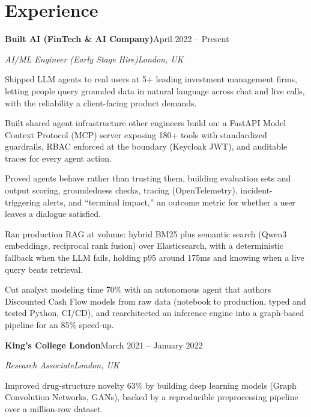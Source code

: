 \documentclass[10pt,a4paper]{article}
\newcommand{\entry}[4]{%
  {\color{company}\bfseries #1}\hfill {\color{muted}#2}\par
  \vspace{1pt}
  {\itshape #3}\hfill {\color{muted}\itshape #4}\par
  \vspace{3pt}%
}
\begin{document}
\section{Experience}
\entry{Built AI (FinTech \& AI Company)}{April 2022 -- Present}{AI/ML Engineer (Early Stage Hire)}{London, UK}
\begin{tight}
  \item Shipped LLM agents to real users at 5+ leading investment management firms, letting people query grounded data in natural language across chat and live calls, with the reliability a client-facing product demands.
  \item Built shared agent infrastructure other engineers build on: a FastAPI Model Context Protocol (MCP) server exposing 180+ tools with standardized guardrails, RBAC enforced at the boundary (Keycloak JWT), and auditable traces for every agent action.
  \item Proved agents behave rather than trusting them, building evaluation sets and output scoring, groundedness checks, tracing (OpenTelemetry), incident-triggering alerts, and ``terminal impact,'' an outcome metric for whether a user leaves a dialogue satisfied.
  \item Ran production RAG at volume: hybrid BM25 plus semantic search (Qwen3 embeddings, reciprocal rank fusion) over Elasticsearch, with a deterministic fallback when the LLM fails, holding p95 around 175ms and knowing when a live query beats retrieval.
  \item Cut analyst modeling time 70\% with an autonomous agent that authors Discounted Cash Flow models from raw data (notebook to production, typed and tested Python, CI/CD), and rearchitected an inference engine into a graph-based pipeline for an 85\% speed-up.
\end{tight}

\entry{King's College London}{March 2021 -- January 2022}{Research Associate}{London, UK}
\begin{tight}
  \item Improved drug-structure novelty 63\% by building deep learning models (Graph Convolution Networks, GANs), backed by a reproducible preprocessing pipeline over a million-row dataset.
\end{tight}

\end{document}
